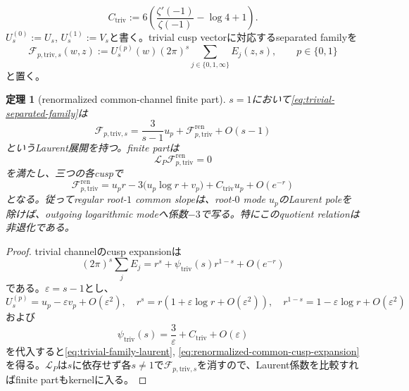 \documentclass[11pt,a4paper]{ltjsarticle}
\newtheorem{theorem}{定理}[section]
\theoremstyle{definition}
\theoremstyle{remark}
\newcommand{\eps}{\varepsilon}
\begin{document}
\begin{equation}\label{eq:gamma2-triv-finite-constant}
 C_{\mathrm{triv}}
 :=6\left(
 \frac{\zeta'(-1)}{\zeta(-1)}-\log4+1
 \right).
\end{equation}
$U_s^{(0)}:=U_s$, $U_s^{(1)}:=V_s$と書く。trivial cusp vectorに対応するseparated familyを
\begin{equation}\label{eq:trivial-separated-family}
 \mathcal F_{p,\mathrm{triv},s}(w,z)
 :=U_s^{(p)}(w)(2\pi)^s
   \sum_{j\in\{0,1,\infty\}}E_j(z,s),
 \qquad p\in\{0,1\}
\end{equation}
と置く。

\begin{theorem}[renormalized common-channel finite part]\label{thm:renormalized-common-channel}
$s=1$において\eqref{eq:trivial-separated-family}は
\begin{equation}\label{eq:trivial-family-laurent}
 \mathcal F_{p,\mathrm{triv},s}
 =\frac{3}{s-1}u_p
  +\mathcal F_{p,\mathrm{triv}}^{\mathrm{ren}}
  +O(s-1)
\end{equation}
というLaurent展開を持つ。finite partは
\[
 \mathscr L_P\mathcal F_{p,\mathrm{triv}}^{\mathrm{ren}}=0
\]
を満たし、三つの各cuspで
\begin{equation}\label{eq:renormalized-common-cusp-expansion}
 \boxed{
 \mathcal F_{p,\mathrm{triv}}^{\mathrm{ren}}
 =u_pr
 -3\bigl(u_p\log r+v_p\bigr)
 +C_{\mathrm{triv}}u_p
 +O(e^{-r})
 }
\end{equation}
となる。従ってregular root-$1$ common slopeは、root-$0$ mode $u_p$のLaurent poleを除けば、outgoing logarithmic modeへ係数$-3$で写る。特にこのquotient relationは非退化である。
\end{theorem}

\begin{proof}
trivial channelのcusp expansionは
\[
 (2\pi)^s\sum_jE_j
 =r^s+\psi_{\mathrm{triv}}(s)r^{1-s}+O(e^{-r})
\]
である。$\eps=s-1$とし、
\[
 U_s^{(p)}=u_p-\eps v_p+O(\eps^2),
 \quad
 r^s=r(1+\eps\log r+O(\eps^2)),
 \quad
 r^{1-s}=1-\eps\log r+O(\eps^2)
\]
および
\[
 \psi_{\mathrm{triv}}(s)=\frac3\eps+C_{\mathrm{triv}}+O(\eps)
\]
を代入すると\eqref{eq:trivial-family-laurent},
\eqref{eq:renormalized-common-cusp-expansion}を得る。$\mathscr L_P$は$s$に依存せず各$s\ne1$で$\mathcal F_{p,\mathrm{triv},s}$を消すので、Laurent係数を比較すればfinite partもkernelに入る。
\end{proof}
\end{document}
